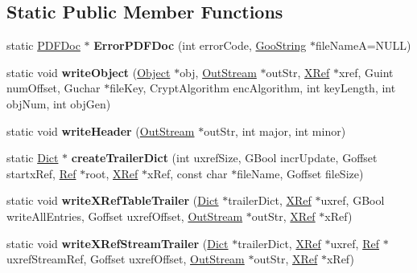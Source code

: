 \subsection*{Static Public Member Functions}
\begin{DoxyCompactItemize}
\item 
\mbox{\label{class_p_d_f_doc_a770767ef479bf13bc179f88f1f008fd6}} 
static \hyperlink{class_p_d_f_doc}{P\+D\+F\+Doc} $\ast$ {\bfseries Error\+P\+D\+F\+Doc} (int error\+Code, \hyperlink{class_goo_string}{Goo\+String} $\ast$file\+NameA=N\+U\+LL)
\item 
\mbox{\label{class_p_d_f_doc_a2edb4830a8d0075a861f0c4b32bd42b4}} 
static void {\bfseries write\+Object} (\hyperlink{class_object}{Object} $\ast$obj, \hyperlink{class_out_stream}{Out\+Stream} $\ast$out\+Str, \hyperlink{class_x_ref}{X\+Ref} $\ast$xref, Guint num\+Offset, Guchar $\ast$file\+Key, Crypt\+Algorithm enc\+Algorithm, int key\+Length, int obj\+Num, int obj\+Gen)
\item 
\mbox{\label{class_p_d_f_doc_af434e5d5b8a10c0a189a5f32bed06c36}} 
static void {\bfseries write\+Header} (\hyperlink{class_out_stream}{Out\+Stream} $\ast$out\+Str, int major, int minor)
\item 
\mbox{\label{class_p_d_f_doc_a636beced05c42f48237080bdcb4dfffd}} 
static \hyperlink{class_dict}{Dict} $\ast$ {\bfseries create\+Trailer\+Dict} (int uxref\+Size, G\+Bool incr\+Update, Goffset startx\+Ref, \hyperlink{struct_ref}{Ref} $\ast$root, \hyperlink{class_x_ref}{X\+Ref} $\ast$x\+Ref, const char $\ast$file\+Name, Goffset file\+Size)
\item 
\mbox{\label{class_p_d_f_doc_a34a064a9b93ac814602b984cc2c4f6b4}} 
static void {\bfseries write\+X\+Ref\+Table\+Trailer} (\hyperlink{class_dict}{Dict} $\ast$trailer\+Dict, \hyperlink{class_x_ref}{X\+Ref} $\ast$uxref, G\+Bool write\+All\+Entries, Goffset uxref\+Offset, \hyperlink{class_out_stream}{Out\+Stream} $\ast$out\+Str, \hyperlink{class_x_ref}{X\+Ref} $\ast$x\+Ref)
\item 
\mbox{\label{class_p_d_f_doc_a59ebd4597c9590690a729a6ec580ff72}} 
static void {\bfseries write\+X\+Ref\+Stream\+Trailer} (\hyperlink{class_dict}{Dict} $\ast$trailer\+Dict, \hyperlink{class_x_ref}{X\+Ref} $\ast$uxref, \hyperlink{struct_ref}{Ref} $\ast$uxref\+Stream\+Ref, Goffset uxref\+Offset, \hyperlink{class_out_stream}{Out\+Stream} $\ast$out\+Str, \hyperlink{class_x_ref}{X\+Ref} $\ast$x\+Ref)
\end{DoxyCompactItemize}


